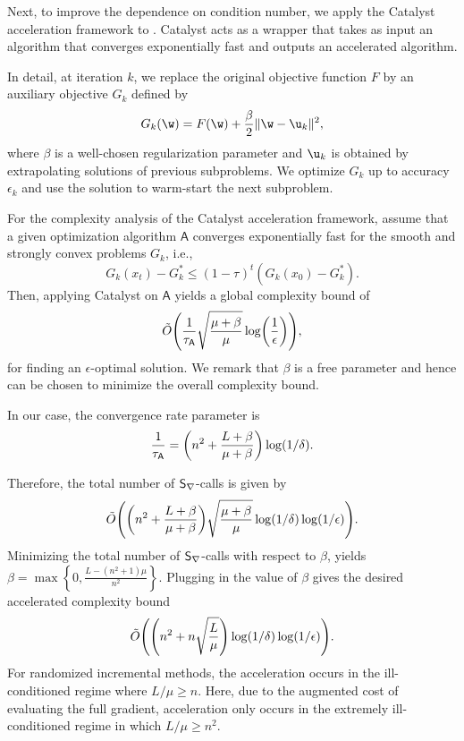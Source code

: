 \documentclass{article}
\theoremstyle{definition}  \newtheorem{exercise}{Exercise}
\theoremstyle{plain}
\DeclarePairedDelimiter{\prn}{(}{)}
\newcommand{\strcvx}{\mu} \newcommand{\query}{B}
\theoremstyle{definition}
\theoremstyle{remark}
\newcommand{\alg}{\mathsf{A}}
\begin{document}
	
	Next, to improve the dependence on condition number, we apply the 
	Catalyst acceleration framework 
	\cite{lin2015universal} to \QSVRG. Catalyst acts 
	as a wrapper that takes as input an algorithm that converges exponentially 
	fast and outputs an accelerated algorithm.
	
	In detail, at 
	iteration $k$, we replace the original objective function $F$ by an 
	auxiliary objective $G_k$ defined by
	\[ G_k(\w) = F(\w) + \frac{\beta}{2} \|\w - \u_k \|^2 ,\]
	where $\beta$ is a well-chosen regularization parameter and $\u_k$ is 
	obtained by extrapolating solutions of previous subproblems. We optimize 
	$G_k$ up to accuracy $\epsilon_k$ and use the solution to 
	warm-start the next subproblem.
	
	
	For the complexity analysis of the Catalyst acceleration 
	framework, assume that a given optimization algorithm $\alg$ 
	converges exponentially fast for the smooth and strongly convex problems 
	$G_k$, i.e.,
	\begin{equation}\label{eq:linear}
	    G_k(x_t)-G_k^* \le (1-\tau_{})^t (G_k(x_0)-G_k^*).
	\end{equation} 
	Then, applying Catalyst on $\alg$ yields \cite{lin2015universal} a global 
	complexity bound of
	\[ \tilde{O} \prn*{ \frac{1}{\tau_{\alg}} \sqrt{\frac{\mu+\beta}{\mu}} \log 
	\prn*{\frac{1}{\epsilon}}}, \]
	for finding an $\epsilon$-optimal solution. We remark that $\beta$ is a 
	free parameter and hence can be chosen to minimize the overall complexity 
	bound.

	In our case, the convergence rate parameter is 
	\[ \frac{1}{\tau_{\alg}} =  \prn*{ 
		n^2+\frac{L+\beta}{\strcvx+\beta}}\log (1/\delta). \]
	
Therefore, the total number of $\mathsf{S}_{\nabla}$-calls is given by 
	\begin{align}
		\tilde{O}\prn*{ \prn*{ 
				n^2+\frac{L+\beta}{\strcvx+\beta}} 
			\sqrt{\frac{\strcvx+\beta}{\strcvx}} \log (1/\delta)\log 
			(1/\epsilon)  }.	
	\end{align}
	Minimizing the total number of $\mathsf{S}_{\nabla}$-calls with respect to $\beta$, 
	yields $\beta= \max 
	\left \{0, \frac{L-(n^2+1)\strcvx}{n^2} \right \}$. Plugging in the value 
	of $\beta$ gives the desired accelerated complexity bound
	\[	\tilde{O}\prn*{\prn*{n^2+n\sqrt{\frac{L}{\mu}}}\log (1/\delta) \log (1/ \epsilon) }. \]
	For randomized incremental methods, the acceleration occurs in 
	the ill-conditioned regime where $L/\mu \ge n$. Here, due to the augmented 
	cost of evaluating the full gradient,  acceleration only occurs in the 
	extremely ill-conditioned regime in which $L/\mu \ge n^2$. 
	
\end{document}
